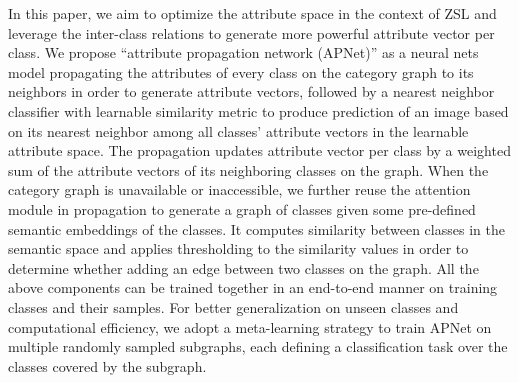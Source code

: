\documentclass[letterpaper]{article} %
\begin{document}
In this paper, we aim to optimize the attribute space in the context of ZSL and leverage the inter-class relations to generate more powerful attribute vector per  class. We propose ``attribute propagation network (APNet)'' as a neural nets model propagating the attributes of every class on the category graph to its neighbors in order to generate attribute vectors, followed by a nearest neighbor classifier with learnable similarity metric to produce prediction of an image based on its nearest neighbor among all classes' attribute vectors in the learnable attribute space. The propagation updates attribute vector per class by a weighted sum of the attribute vectors of its neighboring classes on the graph.
When the category graph is unavailable or inaccessible, we further reuse the attention module in propagation to generate a graph of classes given some pre-defined semantic embeddings of the classes. It computes similarity between classes in the semantic space and applies  thresholding to the similarity values in order to determine whether adding an edge between two classes on the graph.
All the above components can be trained together in an end-to-end manner on training classes and their samples.
For better generalization on unseen classes and computational efficiency,
we adopt a meta-learning strategy to train APNet on multiple randomly sampled subgraphs, each defining a classification task over the classes covered by the subgraph.
\end{document}
